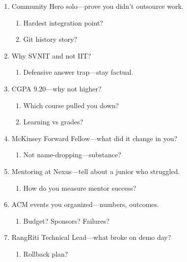 \documentclass[9pt,a4paper]{article}
\begin{document}
\begin{enumerate}[label=\textbf{Q\arabic*:}, leftmargin=*]
\begin{enumerate}[label=\textit{FU\arabic*:}, leftmargin=2em]
    \item What did you lose on?
    \item What did you win on?
  \end{enumerate}
  \item Community Hero solo---prove you didn't outsource work.
  \begin{enumerate}[label=\textit{FU\arabic*:}, leftmargin=2em]
    \item Hardest integration point?
    \item Git history story?
  \end{enumerate}
  \item Why SVNIT and not IIT?
  \begin{enumerate}[label=\textit{FU\arabic*:}, leftmargin=2em]
    \item Defensive answer trap---stay factual.
  \end{enumerate}
  \item CGPA 9.20---why not higher?
  \begin{enumerate}[label=\textit{FU\arabic*:}, leftmargin=2em]
    \item Which course pulled you down?
    \item Learning vs grades?
  \end{enumerate}
  \item McKinsey Forward Fellow---what did it change in you?
  \begin{enumerate}[label=\textit{FU\arabic*:}, leftmargin=2em]
    \item Not name-dropping---substance?
  \end{enumerate}
  \item Mentoring at Nexus---tell about a junior who struggled.
  \begin{enumerate}[label=\textit{FU\arabic*:}, leftmargin=2em]
    \item How do you measure mentor success?
  \end{enumerate}
  \item ACM events you organized---numbers, outcomes.
  \begin{enumerate}[label=\textit{FU\arabic*:}, leftmargin=2em]
    \item Budget? Sponsors? Failures?
  \end{enumerate}
  \item RangRiti Technical Lead---what broke on demo day?
  \begin{enumerate}[label=\textit{FU\arabic*:}, leftmargin=2em]
    \item Rollback plan?

\end{enumerate}
\end{enumerate}
\end{document}
